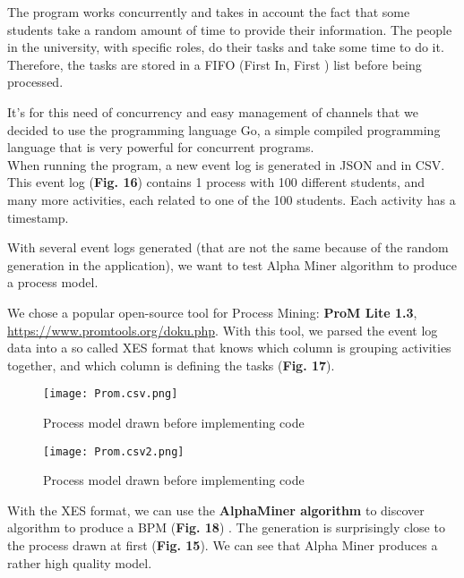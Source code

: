 \documentclass[conference]{IEEEtran}
\begin{document}
The program works concurrently and takes in account the fact that some students take a random amount of time to provide their information. The people in the university, with specific roles, do their tasks and take some time to do it. Therefore, the tasks are stored in a FIFO (First In, First ) list before being processed.

It's for this need of concurrency and easy management of channels that we decided to use the programming language Go, a simple compiled programming language that is very powerful for concurrent programs.\\

When running the program, a new event log is generated in JSON and in CSV. This event log (\textbf{Fig. 16}) contains 1 process with 100 different students, and many more activities, each related to one of the 100 students. Each activity has a timestamp.

With several event logs generated (that are not the same because of the random generation in the application), we want to test Alpha Miner algorithm to produce a process model.

We chose a popular open-source tool for Process Mining: \textbf{ProM Lite 1.3}, \url{https://www.promtools.org/doku.php}. With this tool, we parsed the event log data into a so called XES format that knows which column is grouping activities together, and which column is defining the tasks (\textbf{Fig. 17}).\\

\begin{figure}[htp]
    \centering
    \texttt{[image: Prom.csv.png]}
    \caption{Process model drawn before implementing code}
    \label{fig:Prom}
\end{figure}

\begin{figure}[htp]
    \centering
    \texttt{[image: Prom.csv2.png]}
    \caption{Process model drawn before implementing code}
    \label{fig:Prom2}
\end{figure}

With the XES format, we can use the \textbf{AlphaMiner algorithm} to discover algorithm to produce a BPM (\textbf{Fig. 18}) . The generation is surprisingly close to the process drawn at first (\textbf{Fig. 15}). We can see that Alpha Miner produces a rather high quality model.
\end{document}
